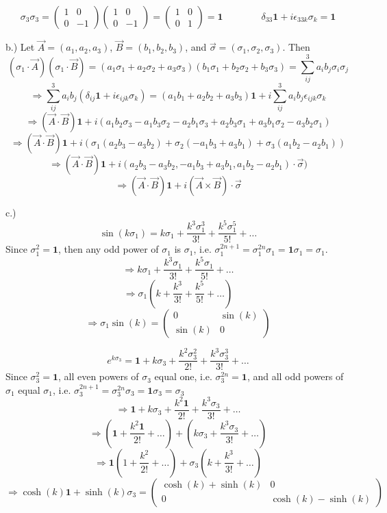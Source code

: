 \documentclass[12pt]{article}
\begin{document}
$$\sigma_3 \sigma_3 = \begin{pmatrix} 1 & 0 \\ 0 & -1 \end{pmatrix} \begin{pmatrix} 1 & 0 \\ 0 & -1 \end{pmatrix} = \begin{pmatrix} 1 & 0 \\ 0 & 1 \end{pmatrix} = \textbf{1} \qquad \qquad \delta_{33}\textbf{1} + i \epsilon_{33k} \sigma_k = \textbf{1}$$

b.) Let $\vec{A} = (a_1, a_2, a_3)$, $\vec{B} = (b_1, b_2, b_3)$, and $\vec{\sigma} = (\sigma_1, \sigma_2, \sigma_3)$. Then
$$(\sigma_1 \cdot \vec{A})(\sigma_1 \cdot \vec{B}) =  (a_1 \sigma_1 + a_2 \sigma_2 + a_3 \sigma_3)(b_1 \sigma_1 + b_2 \sigma_2 + b_3 \sigma_3) = \sum_{ij}^3 a_{i} b_{j} \sigma_i \sigma_j$$
$$\Rightarrow \sum_{ij}^3 a_i b_j (\delta_{ij} \textbf{1} +  i \epsilon_{ijk} \sigma_k) = (a_1 b_1 + a_2 b_2 + a_3 b_3) \textbf{1} + i \sum_{ij}^3 a_i b_j \epsilon_{ijk} \sigma_k$$
$$\Rightarrow (\vec{A} \cdot \vec{B}) \textbf{1} + i(a_1 b_2 \sigma_3 - a_1 b_3 \sigma_2 - a_2 b_1 \sigma_3 + a_2 b_3 \sigma_1 + a_3 b_1 \sigma_2 - a_3 b_2 \sigma_1)$$
$$\Rightarrow (\vec{A} \cdot \vec{B}) \textbf{1} + i(\sigma_1(a_2 b_3 - a_3 b_2) + \sigma_2(-a_1 b_3 + a_3 b_1) + \sigma_3(a_1 b_2 - a_2 b_1))$$
$$\Rightarrow (\vec{A} \cdot \vec{B}) \textbf{1} + i(a_2 b_3 - a_3 b_2, -a_1 b_3 + a_3 b_1, a_1 b_2 - a_2 b_1) \cdot \vec{\sigma})$$
$$\Rightarrow (\vec{A} \cdot \vec{B}) \textbf{1} + i(\vec{A} \times \vec{B}) \cdot \vec{\sigma}$$

c.)$$\sin(k \sigma_1) = k \sigma_1 + \frac{k^3 \sigma_1^3}{3!} + \frac{k^5 \sigma_1^5}{5!} + \dots$$
Since $\sigma_1^2 = \textbf{1}$, then any odd power of $\sigma_1$ is $\sigma_1$, i.e. $\sigma_1^{2n + 1} = \sigma_1^{2n} \sigma_1 = \textbf{1} \sigma_1 = \sigma_1$.
$$\Rightarrow k \sigma_1 + \frac{k^3 \sigma_1}{3!} + \frac{k^5 \sigma_1}{5!} + \dots$$
$$\Rightarrow \sigma_1 (k + \frac{k^3}{3!} + \frac{k^5}{5!} + \dots)$$
$$\Rightarrow \sigma_1 \sin(k) = \begin{pmatrix} 0 & \sin(k) \\ \sin(k) & 0 \end{pmatrix}$$

$$e^{k \sigma_3} = \textbf{1} + k \sigma_3 + \frac{k^2 \sigma_3^2}{2!} + \frac{k^3 \sigma_3^3}{3!} + \dots$$
Since $\sigma_3^2 = \textbf{1}$, all even powers of $\sigma_3$ equal one, i.e. $\sigma_3^{2n} = \textbf{1}$, and all odd powers of $\sigma_1$  equal $\sigma_1$, i.e. $\sigma_3^{2n + 1} = \sigma_3^{2n} \sigma_3 = \textbf{1} \sigma_3 = \sigma_3$ 
$$\Rightarrow \textbf{1} + k \sigma_3 + \frac{k^2 \textbf{1}}{2!} + \frac{k^3 \sigma_3}{3!} + \dots$$
$$\Rightarrow (\textbf{1} + \frac{k^2 \textbf{1}}{2!} + \dots) + (k \sigma_3 + \frac{k^3 \sigma_3}{3!} + \dots)$$
$$\Rightarrow \textbf{1}(1 + \frac{k^2}{2!} + \dots) + \sigma_3(k + \frac{k^3}{3!} + \dots)$$
$$\Rightarrow \cosh(k) \textbf{1} + \sinh(k) \sigma_3 = \begin{pmatrix} \cosh(k) + \sinh(k) & 0 \\ 0 & \cosh(k) - \sinh(k)\end{pmatrix}$$
\end{document}
